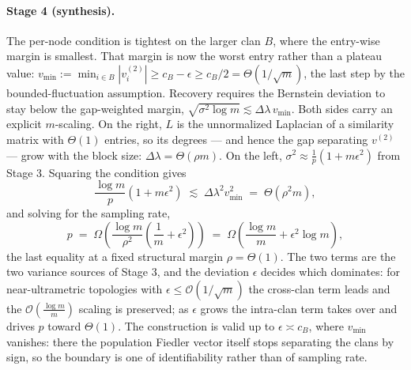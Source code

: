 \documentclass{article}
\begin{document}
\paragraph{Stage 4 (synthesis).}
The per-node condition is tightest on the larger clan $B$, where the entry-wise margin is smallest. That margin is now the worst entry rather than a plateau value: $v_{\min} := \min_{i \in B} |v_i^{(2)}| \ge c_B - \epsilon \ge c_B/2 = \Theta(1/\sqrt{m})$, the last step by the bounded-fluctuation assumption. Recovery requires the Bernstein deviation to stay below the gap-weighted margin, $\sqrt{\sigma^2 \log m} \lesssim \Delta\lambda\, v_{\min}$. Both sides carry an explicit $m$-scaling. On the right, $L$ is the unnormalized Laplacian of a similarity matrix with $\Theta(1)$ entries, so its degrees --- and hence the gap separating $v^{(2)}$ --- grow with the block size: $\Delta\lambda = \Theta(\rho m)$. On the left, $\sigma^2 \approx \frac{1}{p}\left(1 + m\epsilon^2\right)$ from Stage 3. Squaring the condition gives
\begin{equation}
    \frac{\log m}{p}\left(1 + m \epsilon^2\right) \;\lesssim\; \Delta\lambda^2 v_{\min}^2 \;=\; \Theta\!\left(\rho^2 m\right),
\end{equation}
and solving for the sampling rate,
\begin{equation}
    p \;=\; \Omega\!\left(\frac{\log m}{\rho^2}\left(\frac{1}{m} + \epsilon^2\right)\right) \;=\; \Omega\!\left(\frac{\log m}{m} + \epsilon^2 \log m\right),
\end{equation}
the last equality at a fixed structural margin $\rho = \Theta(1)$. The two terms are the two variance sources of Stage 3, and the deviation $\epsilon$ decides which dominates: for near-ultrametric topologies with $\epsilon \le \mathcal{O}(1/\sqrt{m})$ the cross-clan term leads and the $\mathcal{O}(\frac{\log m}{m})$ scaling is preserved; as $\epsilon$ grows the intra-clan term takes over and drives $p$ toward $\Theta(1)$. The construction is valid up to $\epsilon \asymp c_B$, where $v_{\min}$ vanishes: there the population Fiedler vector itself stops separating the clans by sign, so the boundary is one of identifiability rather than of sampling rate.
\end{document}
